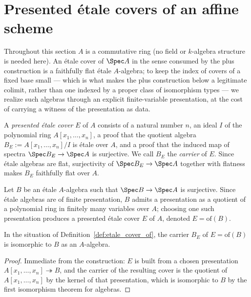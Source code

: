 \section{Presented \'etale covers of an affine scheme}

Throughout this section \(A\) is a commutative ring (no field or \(k\)-algebra structure is
needed here). An \'etale cover of \(\Spec A\) in the sense consumed by the plus construction is
a faithfully flat \'etale \(A\)-algebra; to keep the index of covers of a fixed base
small --- which is what makes the plus construction below a legitimate colimit, rather than one
indexed by a proper class of isomorphism types --- we realize such algebras through an explicit
finite-variable presentation, at the cost of carrying a witness of the presentation as data.

\begin{definition}
  \label{def:etale_cover}
  \leanok
  A \emph{presented \'etale cover} \(E\) of \(A\) consists of a natural number \(n\), an ideal
  \(I\) of the polynomial ring \(A[x_1,\dots,x_n]\), a proof that the quotient algebra
  \(B_E := A[x_1,\dots,x_n]/I\) is \'etale over \(A\), and a proof that the induced map of
  spectra \(\Spec B_E \to \Spec A\) is surjective. We call \(B_E\) the \emph{carrier} of \(E\).
  Since \'etale algebras are flat, surjectivity of \(\Spec B_E \to \Spec A\) together with
  flatness makes \(B_E\) faithfully flat over \(A\).
\end{definition}

\begin{definition}
  \label{def:etale_cover_of}
  \leanok
  Let \(B\) be an \'etale \(A\)-algebra such that \(\Spec B \to \Spec A\) is surjective. Since
  \'etale algebras are of finite presentation, \(B\) admits a presentation as a quotient of a
  polynomial ring in finitely many variables over \(A\); choosing one such presentation
  produces a presented \'etale cover \(E\) of \(A\), denoted \(E = \mathrm{of}(B)\).
\end{definition}

\begin{lemma}
  \label{lem:etale_cover_ofEquiv}
  \leanok
  In the situation of Definition~\ref{def:etale_cover_of}, the carrier \(B_E\) of
  \(E = \mathrm{of}(B)\) is isomorphic to \(B\) as an \(A\)-algebra.
\end{lemma}
\begin{proof}
  \leanok
  Immediate from the construction: \(E\) is built from a chosen presentation
  \(A[x_1,\dots,x_n] \twoheadrightarrow B\), and the carrier of the resulting cover is the
  quotient of \(A[x_1,\dots,x_n]\) by the kernel of that presentation, which is isomorphic to
  \(B\) by the first isomorphism theorem for algebras.
\end{proof}


